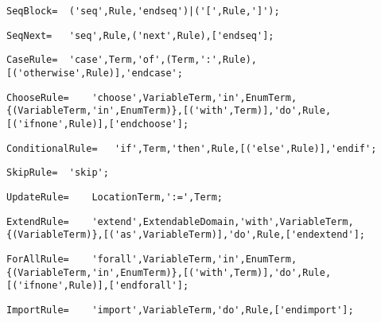 \documentclass{article}
\begin{document}
    \begin{lstlisting}[mathescape=true]
     SeqBlock= 	('seq',Rule,'endseq')|('[',Rule,']');
    \end{lstlisting}
    
    \begin{lstlisting}[mathescape=true]
     SeqNext= 	'seq',Rule,('next',Rule),['endseq'];
    \end{lstlisting}
    
    \begin{lstlisting}[mathescape=true]
     CaseRule= 	'case',Term,'of',(Term,':',Rule),[('otherwise',Rule)],'endcase';
    \end{lstlisting}
    
    \begin{lstlisting}[mathescape=true]
     ChooseRule= 	'choose',VariableTerm,'in',EnumTerm,{(VariableTerm,'in',EnumTerm)},[('with',Term)],'do',Rule,[('ifnone',Rule)],['endchoose'];
    \end{lstlisting}
    
    \begin{lstlisting}[mathescape=true]
     ConditionalRule= 	'if',Term,'then',Rule,[('else',Rule)],'endif';
    \end{lstlisting}
    
    \begin{lstlisting}[mathescape=true]
     SkipRule= 	'skip';
    \end{lstlisting}
    
    \begin{lstlisting}[mathescape=true]
     UpdateRule= 	LocationTerm,':=',Term;
    \end{lstlisting}
    
    \begin{lstlisting}[mathescape=true]
     ExtendRule= 	'extend',ExtendableDomain,'with',VariableTerm,{(VariableTerm)},[('as',VariableTerm)],'do',Rule,['endextend'];
    \end{lstlisting}
    
    \begin{lstlisting}[mathescape=true]
     ForAllRule= 	'forall',VariableTerm,'in',EnumTerm,{(VariableTerm,'in',EnumTerm)},[('with',Term)],'do',Rule,[('ifnone',Rule)],['endforall'];
    \end{lstlisting}
    
    \begin{lstlisting}[mathescape=true]
     ImportRule= 	'import',VariableTerm,'do',Rule,['endimport'];
    \end{lstlisting}
    
\end{document}
